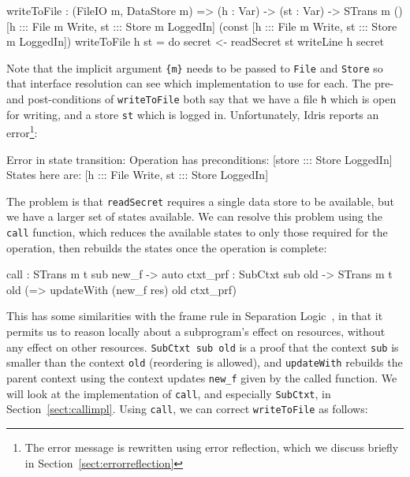 \small
\begin{code}
writeToFile : (FileIO m, DataStore m) =>
              (h : Var) -> (st : Var) ->
              STrans m () [h ::: File {m} Write, st ::: Store {m} LoggedIn]
                   (const [h ::: File {m} Write, st ::: Store {m} LoggedIn])
writeToFile h st = do secret <- readSecret st
                      writeLine h secret
\end{code}
\normalsize

Note that the implicit argument \texttt{\{m\}} needs to be passed to
\texttt{File} and \texttt{Store} so that interface resolution can see which
implementation to use for each.
The pre- and post-conditions of \texttt{writeToFile} both say that we have
a file \texttt{h} which is open for writing, and a store \texttt{st} which
is logged in. Unfortunately, Idris reports an error\footnote{The error message
is rewritten using error reflection, which we discuss briefly in
Section~\ref{sect:errorreflection}}:

\small
\begin{code}
Error in state transition:
      Operation has preconditions: [store ::: Store LoggedIn]
      States here are: [h ::: File Write,
                        st ::: Store LoggedIn]
\end{code}
\normalsize

The problem is that \texttt{readSecret} requires a single data store
to be available, but we have a larger set of states available. We can
resolve this problem using the \texttt{call} function, which reduces the
available states to only those required for the operation, then rebuilds the
states once the operation is complete:

\small
\begin{code}
call : STrans m t sub new_f -> {auto ctxt_prf : SubCtxt sub old} ->
       STrans m t old (\res => updateWith (new_f res) old ctxt_prf)
\end{code}
\normalsize

This has some similarities with the frame rule in Separation 
Logic~\citep{ohearn2001}, in that it permits us to reason locally about
a subprogram's effect on resources, without any effect on other resources.
\texttt{SubCtxt sub old} is a proof that the context \texttt{sub} is
smaller than the context \texttt{old} (reordering is allowed), and
\texttt{updateWith} rebuilds the parent context using the context
updates \texttt{new\_f} given by the called function. We will look at the
implementation of \texttt{call}, and especially \texttt{SubCtxt}, in
Section~\ref{sect:callimpl}.  Using \texttt{call}, we can correct
\texttt{writeToFile} as follows:

